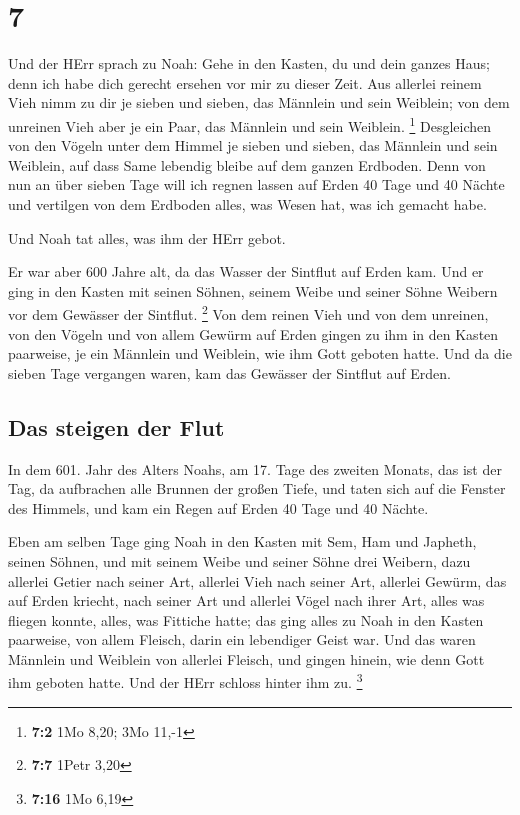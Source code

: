 \hypertarget{section-6}{%
\section{7}\label{section-6}}

 Und der HErr sprach zu Noah: Gehe in den Kasten, du und
dein ganzes Haus; denn ich habe dich gerecht ersehen vor mir zu dieser
Zeit.  Aus allerlei reinem Vieh nimm zu dir je sieben und
sieben, das Männlein und sein Weiblein; von dem unreinen Vieh aber je
ein Paar, das Männlein und sein Weiblein. \footnote{\textbf{7:2} 1Mo
  8,20; 3Mo 11,-1}  Desgleichen von den Vögeln unter dem
Himmel je sieben und sieben, das Männlein und sein Weiblein, auf dass
Same lebendig bleibe auf dem ganzen Erdboden.  Denn von
nun an über sieben Tage will ich regnen lassen auf Erden 40 Tage und 40
Nächte und vertilgen von dem Erdboden alles, was Wesen hat, was ich
gemacht habe.

 Und Noah tat alles, was ihm der HErr gebot.

 Er war aber 600 Jahre alt, da das Wasser der Sintflut auf
Erden kam.  Und er ging in den Kasten mit seinen Söhnen,
seinem Weibe und seiner Söhne Weibern vor dem Gewässer der Sintflut.
\footnote{\textbf{7:7} 1Petr 3,20}  Von dem reinen Vieh
und von dem unreinen, von den Vögeln und von allem Gewürm auf Erden
 gingen zu ihm in den Kasten paarweise, je ein Männlein
und Weiblein, wie ihm Gott geboten hatte.  Und da die
sieben Tage vergangen waren, kam das Gewässer der Sintflut auf Erden.

\hypertarget{das-steigen-der-flut}{%
\subsection{Das steigen der Flut}\label{das-steigen-der-flut}}

 In dem 601. Jahr des Alters Noahs, am 17. Tage des
zweiten Monats, das ist der Tag, da aufbrachen alle Brunnen der großen
Tiefe, und taten sich auf die Fenster des Himmels,  und
kam ein Regen auf Erden 40 Tage und 40 Nächte.

 Eben am selben Tage ging Noah in den Kasten mit Sem, Ham
und Japheth, seinen Söhnen, und mit seinem Weibe und seiner Söhne drei
Weibern,  dazu allerlei Getier nach seiner Art, allerlei
Vieh nach seiner Art, allerlei Gewürm, das auf Erden kriecht, nach
seiner Art und allerlei Vögel nach ihrer Art, alles was fliegen konnte,
alles, was Fittiche hatte;  das ging alles zu Noah in den
Kasten paarweise, von allem Fleisch, darin ein lebendiger Geist war.
 Und das waren Männlein und Weiblein von allerlei
Fleisch, und gingen hinein, wie denn Gott ihm geboten hatte. Und der
HErr schloss hinter ihm zu. \footnote{\textbf{7:16} 1Mo 6,19}

